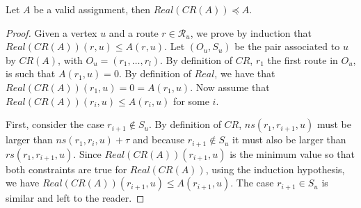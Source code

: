 \documentclass[english]{article}
\begin{document}
\begin{lemma}\label{lemma:prec}
Let $A$ be a valid assignment, then $Real(CR(A)) \preceq A$.
\end{lemma}
\begin{proof}
Given a vertex $u$ and a route $r \in \mathcal{R}_u$, we prove by induction that $Real(CR(A))(r,u) \leq A(r,u)$.
Let $(O_u,S_u)$ be the pair associated to $u$ by $CR(A)$, with $O_u = (r_1,\dots,r_l)$. By definition of $CR$, $r_1$ the first route in $O_u$, is such that $A(r_1,u) = 0$. By definition of $Real$, we have that  $Real(CR(A))(r_1,u) = 0 = A(r_1,u)$.
Now assume that $Real(CR(A))(r_i,u) \leq A(r_i,u)$ for some $i$. 

First, consider the case $r_{i+1} \notin S_u$. By definition of $CR$, $ns(r_1,r_{i+1},u)$ must be larger than 
$ns(r_1,r_{i},u)+ \tau$ and because $r_{i+1} \notin S_u$ it must also be larger than $rs(r_1,r_{i+1},u)$. 
Since $Real(CR(A))(r_{i+1},u)$ is the minimum value so that both constraints are true for $Real(CR(A))$, using
the induction hypothesis, we have $Real(CR(A))(r_{i+1},u) \leq A(r_{i+1},u)$. The case $r_{i+1} \in S_u$ is similar
and left to the reader.
\end{proof}


% 
% 
% 
% 
% 
\end{document}
